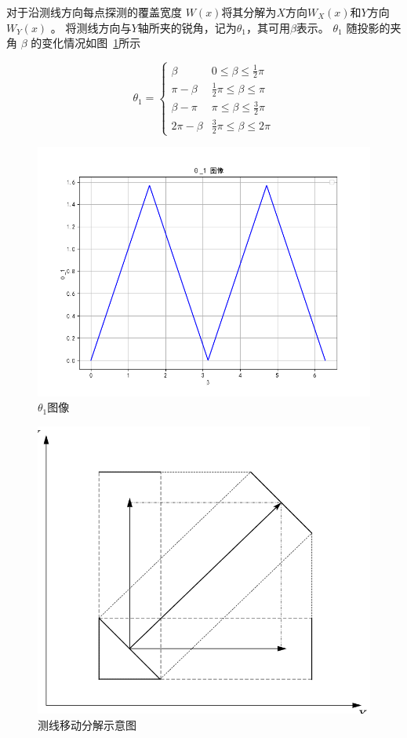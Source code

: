 \documentclass[withoutpreface,bwprint]{cumcmthesis} %
\begin{document}
    对于沿测线方向每点探测的覆盖宽度 $W(x)$将其分解为$X$方向$W_X(x)$和$Y$方向$W_Y(x)$ 。
    将测线方向与$Y$轴所夹的锐角，记为$\theta_1$，其可用$\beta$表示。
    $\theta_1$ 随投影的夹角 $\beta$ 的变化情况如图~\ref{10}所示
    \begin{figure}[htbp]
        \begin{minipage}{0.5\textwidth}
            \begin{equation}
                \theta_1 = \begin{cases}
                    \beta & 0 \leq \beta \leq \frac{1}{2} \pi \\
                    \pi - \beta & \frac{1}{2} \pi \leq \beta \leq \pi \\
                    \beta - \pi & \pi \leq \beta \leq \frac{3}{2} \pi \\
                    2\pi - \beta & \frac{3}{2} \pi \leq \beta \leq 2\pi
                \end{cases}
            \end{equation}
        \end{minipage}
        \begin{minipage}{0.5\textwidth}
            \centering
            \includegraphics[width=\textwidth]{第二问1.png}
            \caption{$\theta_1$图像}
            \label{10}
        \end{minipage}
    \end{figure}
    
    \begin{figure}[htbp]
        \centering
        \includegraphics[width=.4\textwidth]{分解示意图.png}
        \caption{测线移动分解示意图}
        \label{11}
    \end{figure}
\end{document}
